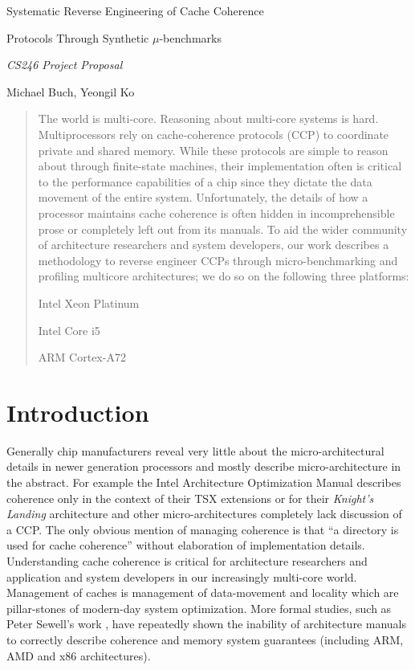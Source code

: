 \documentclass[11pt]{article}
\begin{document}
\frenchspacing

\centerline{\Large Systematic Reverse Engineering of Cache Coherence }
\vspace{0.2em}
\centerline{\Large Protocols Through Synthetic $\mu$-benchmarks }
\vspace{2em}
\centerline{\Large \emph{CS246 Project Proposal}}
\vspace{2em}
\centerline{\large Michael Buch, Yeongil Ko}

\begin{abstract}
The world is multi-core. Reasoning about multi-core systems is hard. Multiprocessors rely on cache-coherence protocols (CCP) to coordinate private and shared memory. While these protocols are simple to reason about through finite-state machines, their implementation often is critical to the performance capabilities of a chip since they dictate the data movement of the entire system. Unfortunately, the details of how a processor maintains cache coherence is often hidden in incomprehensible prose or completely left out from its manuals. To aid the wider community of architecture researchers and system developers, our work describes a methodology to reverse engineer CCPs through micro-benchmarking and profiling multicore architectures; we do so on the following three platforms: 
\begin{enumerate*}[label=(\arabic*)]
    \item Intel Xeon Platinum
    \item Intel Core i5
    \item ARM Cortex-A72
\end{enumerate*}
\end{abstract}

\section{Introduction}
Generally chip manufacturers reveal very little about the micro-architectural details in newer generation processors and mostly describe micro-architecture in the abstract. For example the Intel Architecture Optimization Manual \cite{guide2011intel} describes coherence only in the context of their TSX extensions or for their \textit{Knight's Landing} architecture and other micro-architectures completely lack discussion of a CCP. The only obvious mention of managing coherence is that ``a directory is used for cache coherence'' without elaboration of implementation details. Understanding cache coherence is critical for architecture researchers and application and system developers in our increasingly multi-core world. Management of caches is management of data-movement and locality which are pillar-stones of modern-day system optimization. More formal studies, such as Peter Sewell's work \cite{sewell2010x86,boehm2011multi}, have repeatedly shown the inability of architecture manuals to correctly describe coherence and memory system guarantees (including ARM, AMD and x86 architectures).
\end{document}

